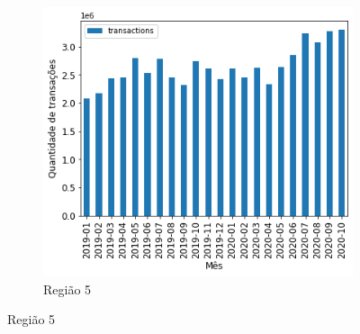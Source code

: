 \begin{figure}[htb]
    \begin{subfigure}[b]{0.45\textwidth} 
        \includegraphics[scale=0.45]{images/base-de-dados-12.5-qtde-transacoes-mensal-por-regiao.png}
        \caption{Região 5}
        \label{fig:pandemia:descritiva-12.5-qtde-transacoes-mensal-por-regiao}
    \end{subfigure}
    \fautor
\end{figure}

